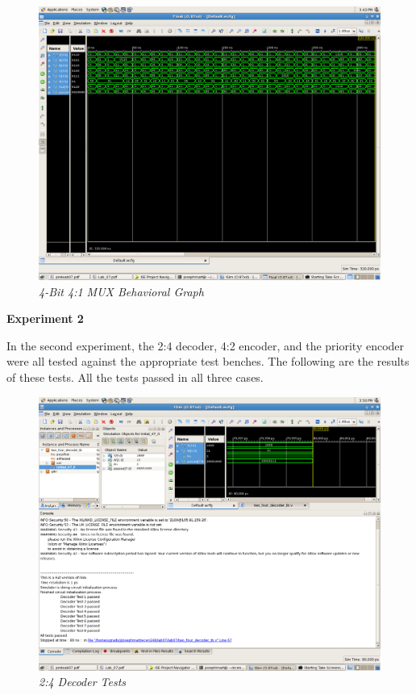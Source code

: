 \documentclass[a4paper,12pt]{article}
\begin{document}
  \newpage

  \begin{figure}[h]
    \begin{center}
      \includegraphics[scale=0.18]{1_3_2.png}
      \caption{\textit{4-Bit 4:1 MUX Behavioral Graph}}
    \end{center}
  \end{figure}

  \hspace{-15pt}\textbf{Experiment 2}

  \vspace{15pt}In the second experiment, the 2:4 decoder, 4:2 encoder, and the
   priority encoder were all tested against the appropriate test benches. The
   following are the results of these tests. All the tests passed in all three cases.

  \begin{figure}[h]
    \begin{center}
      \includegraphics[scale=0.18]{2_1_1.png}
      \caption{\textit{2:4 Decoder Tests}}
    \end{center}
  \end{figure}
\end{document}
